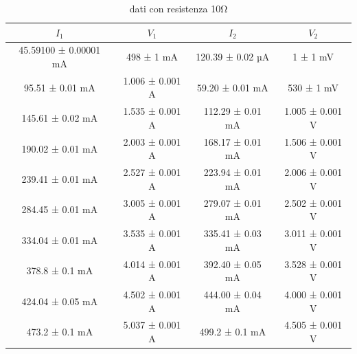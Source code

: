 \documentclass[a4paper]{article}
\begin{document}
\begin{table}[htbp]
\centering
\caption{dati con resistenza 10$\si{\ohm}$}
\label{tab:resistenza10}
\begin{tabular}{|c|c|c|c|}
\hline
$I_1$ & $V_1$ & $I_2$ & $V_2$ \\\hline\hline
45.59100 ± 0.00001 mA & 498 ± 1 mA & 120.39 ± 0.02 µA & 1 ± 1 mV \\
95.51 ± 0.01 mA & 1.006 ± 0.001 A & 59.20 ± 0.01 mA & 530 ± 1 mV \\
145.61 ± 0.02 mA & 1.535 ± 0.001 A & 112.29 ± 0.01 mA & 1.005 ± 0.001 V \\
190.02 ± 0.01 mA & 2.003 ± 0.001 A & 168.17 ± 0.01 mA & 1.506 ± 0.001 V \\
239.41 ± 0.01 mA & 2.527 ± 0.001 A & 223.94 ± 0.01 mA & 2.006 ± 0.001 V \\
284.45 ± 0.01 mA & 3.005 ± 0.001 A & 279.07 ± 0.01 mA & 2.502 ± 0.001 V \\
334.04 ± 0.01 mA & 3.535 ± 0.001 A & 335.41 ± 0.03 mA & 3.011 ± 0.001 V \\
378.8 ± 0.1 mA & 4.014 ± 0.001 A & 392.40 ± 0.05 mA & 3.528 ± 0.001 V \\
424.04 ± 0.05 mA & 4.502 ± 0.001 A & 444.00 ± 0.04 mA & 4.000 ± 0.001 V \\
473.2 ± 0.1 mA & 5.037 ± 0.001 A & 499.2 ± 0.1 mA & 4.505 ± 0.001 V \\
\hline
\end{tabular}
\end{table}
\end{document}
